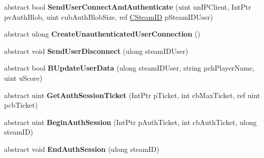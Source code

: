 \begin{DoxyCompactItemize}
\item 
\mbox{\label{class_valve_1_1_steamworks_1_1_i_steam_game_server_a6fd967636be23d9b0240f09da57e4293}} 
abstract bool {\bfseries Send\+User\+Connect\+And\+Authenticate} (uint un\+I\+P\+Client, Int\+Ptr pv\+Auth\+Blob, uint cub\+Auth\+Blob\+Size, ref \hyperlink{struct_valve_1_1_steamworks_1_1_c_steam_i_d}{C\+Steam\+ID} p\+Steam\+I\+D\+User)
\item 
\mbox{\label{class_valve_1_1_steamworks_1_1_i_steam_game_server_ad1c40bd0819219fda1436be8e20cea01}} 
abstract ulong {\bfseries Create\+Unauthenticated\+User\+Connection} ()
\item 
\mbox{\label{class_valve_1_1_steamworks_1_1_i_steam_game_server_a75bbe425dad32982e9d69507140fbcb7}} 
abstract void {\bfseries Send\+User\+Disconnect} (ulong steam\+I\+D\+User)
\item 
\mbox{\label{class_valve_1_1_steamworks_1_1_i_steam_game_server_a8dad4928e8be8ee43e1cc1d3b0471fa6}} 
abstract bool {\bfseries B\+Update\+User\+Data} (ulong steam\+I\+D\+User, string pch\+Player\+Name, uint u\+Score)
\item 
\mbox{\label{class_valve_1_1_steamworks_1_1_i_steam_game_server_aebb1cae492c4c14252c1f6785a2a2b77}} 
abstract uint {\bfseries Get\+Auth\+Session\+Ticket} (Int\+Ptr p\+Ticket, int cb\+Max\+Ticket, ref uint pcb\+Ticket)
\item 
\mbox{\label{class_valve_1_1_steamworks_1_1_i_steam_game_server_a61b9607128c49a67d6eff8e1738c00a1}} 
abstract uint {\bfseries Begin\+Auth\+Session} (Int\+Ptr p\+Auth\+Ticket, int cb\+Auth\+Ticket, ulong steam\+ID)
\item 
\mbox{\label{class_valve_1_1_steamworks_1_1_i_steam_game_server_a9b4e62e72490543b62ed0e197c417c5c}} 
abstract void {\bfseries End\+Auth\+Session} (ulong steam\+ID)
\item 
\mbox{\label{class_valve_1_1_steamworks_1_1_i_steam_game_server_a04581c7faa24fb118f2a976a9254836b}} 

\end{DoxyCompactItemize}
